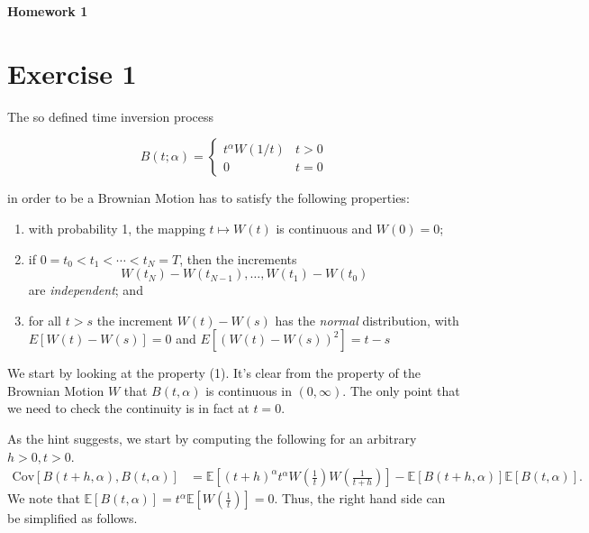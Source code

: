 \documentclass[a4paper,12pt]{article} %
\newcommand{\Cov}{\mathrm{Cov}}
\begin{document}
\begin{center} %
    {\Large \bf Homework 1}
\end{center}

\vspace{0.4cm}


\onehalfspacing
\section{Exercise 1}
The so defined time inversion process

\begin{equation}
    B(t; \alpha) = \begin{cases}
        t^{\alpha} W(1/t) & t > 0 \\
        0                 & t = 0
    \end{cases}
\end{equation}

in order to be a Brownian Motion has to satisfy the following properties:
\begin{enumerate}
    \item with probability 1, the mapping \( t \mapsto W(t) \) is continuous and \( W(0) = 0 \);
    \item if \( 0 = t_0 < t_1 < \cdots < t_N = T \), then the increments
          \[
              W(t_N) - W(t_{N-1}), \dots, W(t_1) - W(t_0)
          \]
          are \textit{independent}; and
    \item for all \( t > s \) the increment \( W(t) - W(s) \) has the \textit{normal} distribution, with \( E[W(t) - W(s)] = 0 \) and \( E[(W(t) - W(s))^2] = t - s \)
\end{enumerate}

We start by looking at the property (1). It's clear from the property of the Brownian Motion \(W\) that \(B(t, \alpha )\) is continuous in \((0, \infty )\). The only point that we need to check the continuity is in fact at \(t=0\).

As the hint suggests, we start by computing the following for an arbitrary \(h>0, t>0\).
\begin{align*}
    \Cov\left[B(t+h, \alpha ), B(t, \alpha ) \right] & = \mathbb{E} \left[ (t+h)^{\alpha} t^{\alpha} W\left( \frac{1}{t} \right) W\left( \frac{1}{t+h} \right) \right] - \mathbb{E} \left[ B(t+h, \alpha) \right] \mathbb{E} \left[ B(t, \alpha) \right].
\end{align*}
We note that \( \mathbb{E} \left[ B(t, \alpha) \right] = t^{\alpha }\mathbb{E} \left[ W\left( \frac{1}{t} \right)  \right]=0 \). Thus, the right hand side can be simplified as follows.
\end{document}
